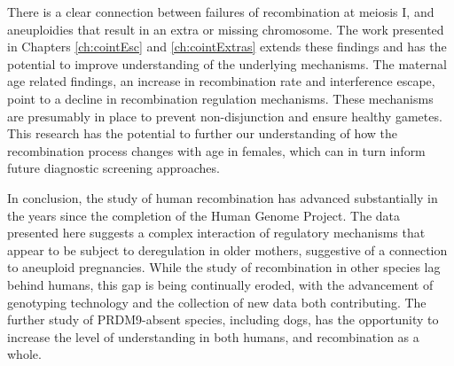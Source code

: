 There is a clear connection between failures of recombination at meiosis I, and aneuploidies that result in an extra or missing chromosome\cite{Nagaoka2012}.
The work presented in Chapters \ref{ch:cointEsc} and \ref{ch:cointExtras} extends these findings and has the potential to improve understanding of the underlying mechanisms.
The maternal age related findings, an increase in recombination rate and interference escape, point to a decline in recombination regulation mechanisms.
These mechanisms are presumably in place to prevent non-disjunction and ensure healthy gametes.
This research has the potential to further our understanding of how the recombination process changes with age in females, which can in turn inform future diagnostic screening approaches.





In conclusion, the study of human recombination has advanced substantially in the years since the completion of the Human Genome Project.
The data presented here suggests a complex interaction of regulatory mechanisms that appear to be subject to deregulation in older mothers, suggestive of a connection to aneuploid pregnancies.
While the study of recombination in other species lag behind humans, this gap is being continually eroded, with the advancement of genotyping technology and the collection of new data both contributing.
The further study of PRDM9-absent species, including dogs, has the opportunity to increase the level of understanding in both humans, and recombination as a whole.



\clearpage
\renewcommand{\bibname}{References}

\begingroup
    \setlength{\bibsep}{10pt}
    \linespread{1}\selectfont
    
\endgroup
